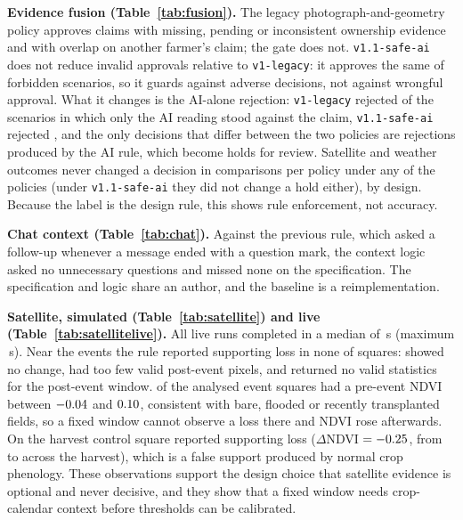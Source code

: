 \documentclass[journal]{IEEEtran}
\begin{document}
\textbf{Evidence fusion (Table~\ref{tab:fusion}).} The legacy photograph-and-geometry policy approves claims with missing, pending or inconsistent ownership evidence and with overlap on another farmer's claim; the gate does not. \texttt{v1.1-safe-ai} does not reduce invalid approvals relative to \texttt{v1-legacy}: it approves the same \FusionSafeAiInvalidApprovals{} of \FusionInvalidApprovalDenominator{} forbidden scenarios, so it guards against adverse decisions, not against wrongful approval. What it changes is the AI-alone rejection: \texttt{v1-legacy} rejected \FusionLegacyRejectedOnAiAlone{} of the \FusionAiAloneScenarios{} scenarios in which only the AI reading stood against the claim, \texttt{v1.1-safe-ai} rejected \FusionSafeAiRejectedOnAiAlone{}, and the only decisions that differ between the two policies are \FusionSafeAiChangedDecisions{} rejections produced by the AI rule, which become holds for review. Satellite and weather outcomes never changed a decision in \FusionComparisonsPerPolicy{} comparisons per policy under any of the \PolicyCountWord{} policies (under \texttt{v1.1-safe-ai} they did not change a hold either), by design. Because the label is the design rule, this shows rule enforcement, not accuracy.

\textbf{Chat context (Table~\ref{tab:chat}).} Against the previous rule, which asked a follow-up whenever a message ended with a question mark, the context logic asked no unnecessary questions and missed none on the specification. The specification and logic share an author, and the baseline is a reimplementation.

\textbf{Satellite, simulated (Table~\ref{tab:satellite}) and live (Table~\ref{tab:satellitelive}).} All \SatLiveSquares{} live runs completed in a median of \SatLatencyMedianSeconds\,s (maximum \SatLatencyMaxSeconds\,s). Near the \SatEventCountWord{} events the rule reported supporting loss in none of \SatEventSquares{} squares: \SatEventNoChange{} showed no change, \SatEventTooFewValid{} had too few valid post-event pixels, and \SatEventNoPostData{} returned no valid statistics for the post-event window. \SatLowPreNdviCountCapWord{} of the analysed event squares had a pre-event NDVI between $-0.04$ and $0.10$, consistent with bare, flooded or recently transplanted fields, so a fixed window cannot observe a loss there and NDVI rose afterwards. On the harvest control \SatControlSupportsWord{} square reported supporting loss ($\Delta$NDVI $=-0.25$, from \SatControlSupportPreNdvi{} to \SatControlSupportPostNdvi{} across the harvest), which is a false support produced by normal crop phenology. These observations support the design choice that satellite evidence is optional and never decisive, and they show that a fixed window needs crop-calendar context before thresholds can be calibrated.
\end{document}
